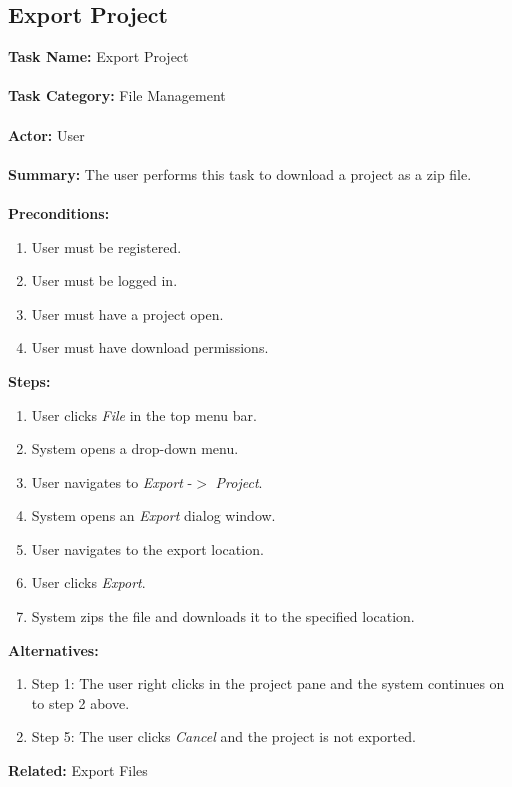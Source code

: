 \documentclass[14pt, a4paper]{article}
\begin{document}
\newpage

\subsection{Export Project}

\begin{framed}
	\noindent\textbf{Task Name:} Export Project \\ \\
	\textbf{Task Category:} File Management \\ \\
	\textbf{Actor:} User \\ \\
	\textbf{Summary:} The user performs this task to download a project as a zip file. \\ \\
	\textbf{Preconditions:} 
	\begin{enumerate}
		\item User must be registered.
		\item User must be logged in.
		\item User must have a project open.
		\item User must have download permissions.
	\end{enumerate}
	\textbf{Steps:}
	\begin{enumerate}
		\item User clicks \textit{File} in the top menu bar.
		\item System opens a drop-down menu.
		\item User navigates to \textit{Export} -$>$ \textit{Project}.
		\item System opens an \textit{Export} dialog window.
		\item User navigates to the export location.
		\item User clicks \textit{Export}.
		\item System zips the file and downloads it to the specified location.
	\end{enumerate}
	\textbf{Alternatives:} 
	\begin{enumerate}
		\item Step 1: The user right clicks in the project pane and the system continues on to step 2 above.
		\item Step 5: The user clicks \textit{Cancel} and the project is not exported.
	\end{enumerate}
	\textbf{Related:} Export Files
\end{framed}
\end{document}
